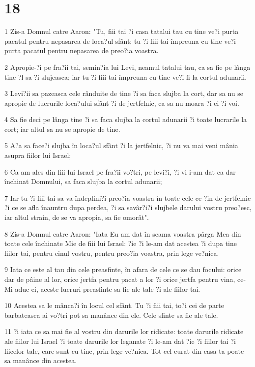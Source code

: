 \chapter{18}

\par 1 Zis-a Domnul catre Aaron: "Tu, fiii tai ?i casa tatalui tau cu tine ve?i purta pacatul pentru nepasarea de loca?ul sfânt; tu ?i fiii tai împreuna cu tine ve?i purta pacatul pentru nepasarea de preo?ia voastra.
\par 2 Apropie-?i pe fra?ii tai, semin?ia lui Levi, neamul tatalui tau, ca sa fie pe lânga tine ?l sa-?i slujeasca; iar tu ?i fiii tai împreuna cu tine ve?i fi la cortul adunarii.
\par 3 Levi?ii sa pazeasca cele rânduite de tine ?i sa faca slujba la cort, dar sa nu se apropie de lucrurile loca?ului sfânt ?i de jertfelnic, ca sa nu moara ?i ei ?i voi.
\par 4 Sa fie deci pe lânga tine ?i sa faca slujba la cortul adunarii ?i toate lucrarile la cort; iar altul sa nu se apropie de tine.
\par 5 A?a sa face?i slujba în loca?ul sfânt ?i la jertfelnic, ?i nu va mai veni mânia asupra fiilor lui Israel;
\par 6 Ca am ales din fiii lui Israel pe fra?ii vo?tri, pe levi?i, ?i vi i-am dat ca dar închinat Domnului, sa faca slujba la cortul adunarii;
\par 7 Iar tu ?i fiii tai sa va îndeplini?i preo?ia voastra în toate cele ce ?in de jertfelnic ?i ce se afla înauntru dupa perdea, ?i sa savâr?i?i slujbele darului vostru preo?esc, iar altul strain, de se va apropia, sa fie omorât".
\par 8 Zis-a Domnul catre Aaron: "Iata Eu am dat în seama voastra pârga Mea din toate cele închinate Mie de fiii lui Israel: ?ie ?i le-am dat acestea ?i dupa tine fiilor tai, pentru cinul vostru, pentru preo?ia voastra, prin lege ve?nica.
\par 9 Iata ce este al tau din cele preasfinte, în afara de cele ce se dau focului: orice dar de pâine al lor, orice jertfa pentru pacat a lor ?i orice jertfa pentru vina, ce-Mi aduc ei, aceste lucruri preasfinte sa fie ale tale ?i ale fiilor tai.
\par 10 Acestea sa le mânca?i în locul cel sfânt. Tu ?i fiii tai, to?i cei de parte barbateasca ai vo?tri pot sa manânce din ele. Cele sfinte sa fie ale tale.
\par 11 ?i iata ce sa mai fie al vostru din darurile lor ridicate: toate darurile ridicate ale fiilor lui Israel ?i toate darurile lor leganate ?i le-am dat ?ie ?i fiilor tai ?i fiicelor tale, care sunt cu tine, prin lege ve?nica. Tot cel curat din casa ta poate sa manânce din acestea.
